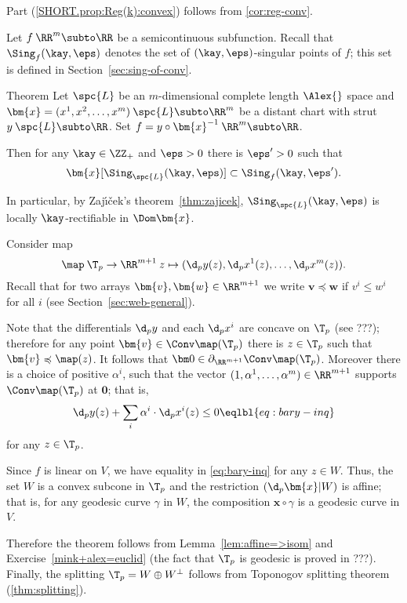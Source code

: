 Part (\ref{SHORT.prop:Reg(k):convex}) follows from \ref{cor:reg-conv}.
\qeds


 

Let $f\:\RR^m\subto\RR$ be a semicontinuous subfunction.
Recall that $\Sing_f(\kay,\eps)$ denotes the set of $(\kay,\eps)$-singular points of $f$; this set is defined in Section~\ref{sec:sing-of-conv}.




\begin{thm}{Theorem}\label{thm:reg-point}
Let $\spc{L}$ be an $m$-dimensional complete length $\Alex{}$ space
and $\bm{x}=(x^1,x^2,\dots,x^m)\:\spc{L}\subto\RR^m$ be a distant chart with strut $y\:\spc{L}\subto\RR$.
Set $f=y\circ\bm{x}^{-1}\:\RR^m\subto \RR$.

Then for any $\kay\in\ZZ_+$
and $\eps>0$ there is $\eps'>0$ such that
\[\bm{x}[\Sing_{\spc{L}}(\kay,\eps)]\subset \Sing_f(\kay,\eps').\]

In particular, by Zaj\'{\i}\v{c}ek's theorem~\ref{thm:zajicek}, $\Sing_{\spc{L}}(\kay,\eps)$ is locally $\kay$-rectifiable in $\Dom \bm{x}$. 
\end{thm} 

Consider map 
\[\map\:\T_p\to\RR^{m+1}\:z\mapsto(\d_py(z),\d_px^1(z),\dots,\d_px^m(z)).\]
Recall that for two arrays $\bm{v},\bm{w}\in\RR^{m+1}$
we write $\bm{v}\preccurlyeq\bm{w}$ if $v^i\le w^i$ for all $i$
(see Section~\ref{sec:web-general}).

Note that the differentials $\d_py$ and each $\d_px^i$ are concave on $\T_p$
(see ???);
therefore for any point $\bm{v}\in\Conv\map(\T_p)$ there is $z\in \T_p$ such that $\bm{v}\preccurlyeq\map(z)$.
It follows that $\bm0\in\partial_{\RR^{m+1}}\Conv \map(\T_p)$.
Moreover there is a choice of positive $\alpha^i$,
such that the vector $(1,\alpha^1,\dots,\alpha^m)\in\RR^{m+1}$
supports $\Conv \map(\T_p)$ at $\bm{0}$; 
that is,
\[\d_py(z)+\sum_i\alpha^i\cdot\d_px^i(z)\le 0
\eqlbl{eq:bary-inq}\]
for any $z\in\T_p$.

Since $f$ is linear on $V$, we have equality in \ref{eq:bary-inq} for any  $z\in W$.
Thus, the set $W$ is a convex subcone in $\T_p$ 
and the restriction $(\d_p\bm{x}|W)$ is affine;
that is, for any geodesic curve $\gamma$ in $W$, 
the composition $\bm{x}\circ\gamma$ is a geodesic curve in $V$.

Therefore the theorem follows from Lemma~\ref{lem:affine=>isom}
and Exercise~\ref{mink+alex=euclid} (the fact that $\T_p$ is geodesic is proved in ???).
Finally, the splitting $\T_p=W\oplus W^\bot$ follows from Toponogov splitting theorem (\ref{thm:splitting}).
\qeds

